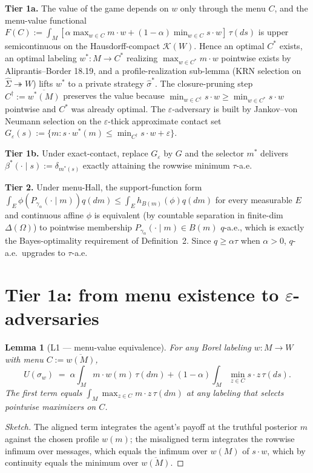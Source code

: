 \documentclass[11pt]{article}
\newtheorem{lemma}[theorem]{Lemma}
\theoremstyle{definition}
\theoremstyle{remark}
\newcommand{\eps}{\varepsilon}
\newcommand{\Om}{\Omega}
\newcommand{\Si}{\Sigma}
\begin{document}
\textbf{Tier 1a.} The value of the game depends on $w$ only through
the menu $C$, and the menu-value functional
$F(C) := \int_M[\alpha\max_{w\in C} m\cdot w + (1-\alpha)\min_{w\in C} s\cdot w]\,\tau(ds)$
is upper semicontinuous on the Hausdorff-compact $\mathcal K(W)$.
Hence an optimal $C^*$ exists, an optimal labeling
$w^*:M\to C^*$ realizing $\max_{w\in C^*} m\cdot w$ pointwise exists
by Aliprantis--Border 18.19, and a profile-realization sub-lemma
(KRN selection on $\hat\Si\twoheadrightarrow W$) lifts $w^*$ to a
private strategy $\hat\sigma^*$. The closure-pruning step
$C^\dagger := \overline{w^*(M)}$ preserves the value because
$\min_{w\in C^\dagger}s\cdot w \ge \min_{w\in C^*}s\cdot w$ pointwise
and $C^*$ was already optimal. The $\eps$-adversary is built by
Jankov--von Neumann selection on the $\eps$-thick approximate
contact set $G_\eps(s) := \{m : s\cdot w^*(m)\le \min_{C^\dagger}s\cdot w + \eps\}$.

\textbf{Tier 1b.} Under exact-contact, replace $G_\eps$ by $G$
and the selector $m^*$ delivers $\beta^*(\cdot\mid s) := \delta_{m^*(s)}$
exactly attaining the rowwise minimum $\tau$-a.e.

\textbf{Tier 2.} Under menu-Hall, the support-function form
$\int_E\phi(P_{\gamma_\alpha}(\cdot\mid m))q(dm) \le \int_E h_{B(m)}(\phi)q(dm)$
for every measurable $E$ and continuous affine $\phi$ is equivalent
(by countable separation in finite-dim $\Delta(\Om)$) to pointwise
membership $P_{\gamma_\alpha}(\cdot\mid m)\in B(m)$ $q$-a.e., which
is exactly the Bayes-optimality requirement of Definition~2. Since
$q\ge\alpha\tau$ when $\alpha>0$, $q$-a.e.~upgrades to $\tau$-a.e.

\section{Tier 1a: from menu existence to $\eps$-adversaries}\label{sec:tier1a}

\begin{lemma}[L1 --- menu-value equivalence]\label{lem:menu-value}
For any Borel labeling $w:M\to W$ with menu $C := \overline{w(M)}$,
\[
  U(\sigma_w) \;=\; \alpha\!\int_M m\cdot w(m)\,\tau(dm) + (1-\alpha)\!\int_M\min_{z\in C} s\cdot z\,\tau(ds).
\]
The first term equals $\int_M\max_{z\in C}m\cdot z\,\tau(dm)$ at any
labeling that selects pointwise maximizers on $C$.
\end{lemma}

\begin{proof}[Sketch]
The aligned term integrates the agent's payoff at the truthful
posterior $m$ against the chosen profile $w(m)$; the misaligned
term integrates the rowwise infimum over messages, which equals the
infimum over $w(M)$ of $s\cdot w$, which by continuity equals the
minimum over $\overline{w(M)}$.
\end{proof}
\end{document}
